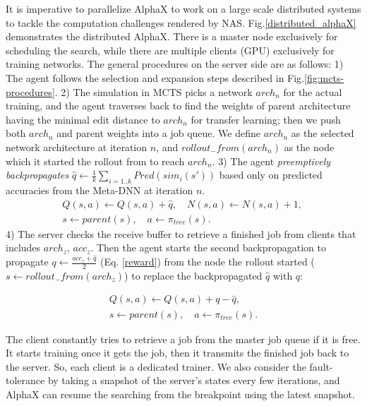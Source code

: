 \documentclass[10pt,twocolumn,letterpaper]{article}
\begin{document}
It is imperative to parallelize AlphaX to work on a large scale distributed systems to tackle the computation challenges rendered by NAS.
Fig.\ref{distributed_alphaX} demonstrates the distributed AlphaX. There is a master node exclusively for scheduling the search, while there are multiple clients (GPU) exclusively for training networks. The general procedures on the server side are as follows: 1) The agent follows the selection and expansion steps described in Fig.\ref{fig:mcts-procedures}. 2) The simulation in MCTS picks a network $arch_n$ for the actual training, and the agent traverses back to find the weights of parent architecture having the minimal edit distance to $arch_n$ for transfer learning; then we push both $arch_n$ and parent weights into a job queue. We define $arch_n$ as the selected network architecture at iteration $n$, and $rollout_{-}from(arch_n)$ as the node which it started the rollout from to reach $arch_n$. 3) The agent {\it preemptively backpropagates} $\hat{q} \leftarrow \frac{1}{k} \sum_{i=1..k} Pred(sim_i(s'))$ based only on predicted accuracies from the Meta-DNN at iteration $n$.
\begin{equation}
	\begin{split}
	&Q(s, a) \leftarrow Q(s, a) + \hat{q}, \quad
	N(s, a) \leftarrow N(s, a) + 1, \quad \\
	&s \leftarrow parent(s), \quad
	a \leftarrow \pi_{tree}(s).
	\end{split}
\end{equation}
4) The server checks the receive buffer to retrieve a finished job from clients that includes $arch_z$, $acc_z$.
Then the agent starts the second backpropagation to propagate $q \leftarrow \frac{acc_z + \hat{q}}{2}$ (Eq. \ref{reward}) from the node the rollout started ($s \leftarrow rollout_{-}from(arch_z)$) to replace the backpropagated $\hat{q}$ with $q$:

\begin{equation}
	\begin{split}
	Q(s, a) \leftarrow Q(s, a) + q - \hat{q}, \quad \\
	s \leftarrow parent(s), \quad 
	a \leftarrow \pi_{tree}(s).
	\end{split}
\end{equation}







The client constantly tries to retrieve a job from the master job queue if it is free. It starts training once it gets the job, then it transmits the finished job back to the server. So, each client is a dedicated trainer. We also consider the fault-tolerance by taking a snapshot of the server's states every few iterations, and AlphaX can resume the searching from the breakpoint using the latest snapshot.
\end{document}
